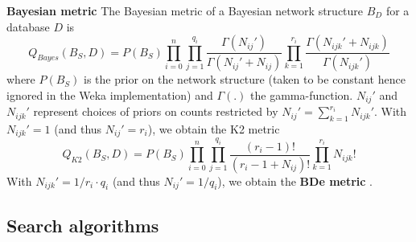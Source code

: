 {\bf Bayesian metric}
The Bayesian metric of a Bayesian network structure $B_D$ for a database $D$ is
$$
Q_{Bayes}(B_S,D) = P(B_S)\prod_{i=0}^n\prod_{j=1}^{q_i}\frac{\Gamma(N_{ij}')}{\Gamma(N_{ij}'+N_{ij})}
\prod_{k=1}^{r_i}\frac{\Gamma(N_{ijk}'+N_{ijk})}{\Gamma(N_{ijk}')}
$$
where $P(B_S)$ is the prior on the network structure (taken to be constant hence ignored 
in the Weka implementation) and $\Gamma(.)$ the gamma-function. $N_{ij}'$ and $N_{ijk}'$
represent choices of priors on counts restricted by 
$N_{ij}'=\sum_{k=1}^{r_i}N_{ijk}'$. With $N_{ijk}'=1$ (and thus $N_{ij}'=r_i$), 
we obtain the K2 metric \cite{CooperHerskovits1992}
$$
Q_{K2}(B_S,D) = P(B_S)\prod_{i=0}^n\prod_{j=1}^{q_i}\frac{(r_i-1)!}{(r_i-1+N_{ij})!}
\prod_{k=1}^{r_i}N_{ijk}!
$$
With $N_{ijk}'=1/r_i\cdot q_i$ (and thus $N_{ij}'=1/q_i$), we obtain the {\bf BDe metric}
\cite{heckerman95}.


\subsection{Search algorithms \label{sec.score.search}}

